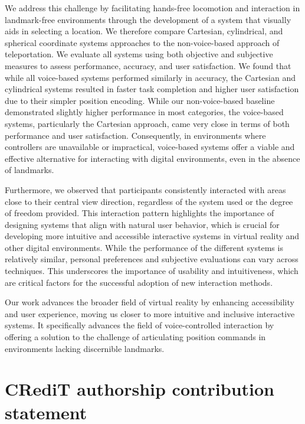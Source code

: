 \documentclass[preprint,12pt]{elsarticle}
\newcommand{\reftext}[1]{{\color{gray}#1}}   %
\begin{document}
\reftext{We address this challenge by facilitating hands-free locomotion and interaction in landmark-free environments through the development of a system that visually aids in selecting a location. We therefore compare Cartesian, cylindrical, and spherical coordinate systems approaches to the non-voice-based approach of teleportation. We evaluate all systems using both objective and subjective measures to assess performance, accuracy, and user satisfaction. We found that while all voice-based systems performed similarly in accuracy, the Cartesian and cylindrical systems resulted in faster task completion and higher user satisfaction due to their simpler position encoding. While our non-voice-based baseline demonstrated slightly higher performance in most categories, the voice-based systems, particularly the Cartesian approach, came very close in terms of both performance and user satisfaction. Consequently, in environments where controllers are unavailable or impractical, voice-based systems offer a viable and effective alternative for interacting with digital environments, even in the absence of landmarks.}

\reftext{Furthermore, we observed that participants consistently interacted with areas close to their central view direction, regardless of the system used or the degree of freedom provided. This interaction pattern highlights the importance of designing systems that align with natural user behavior, which is crucial for developing more intuitive and accessible interactive systems in virtual reality and other digital environments. While the performance of the different systems is relatively similar, personal preferences and subjective evaluations can vary across techniques. This underscores the importance of usability and intuitiveness, which are critical factors for the successful adoption of new interaction methods.}

\reftext{Our work advances the broader field of virtual reality by enhancing accessibility and user experience, moving us closer to more intuitive and inclusive interactive systems. It specifically advances the field of voice-controlled interaction by offering a solution to the challenge of articulating position commands in environments lacking discernible landmarks.}


\section*{CRediT authorship contribution statement}
\end{document}
